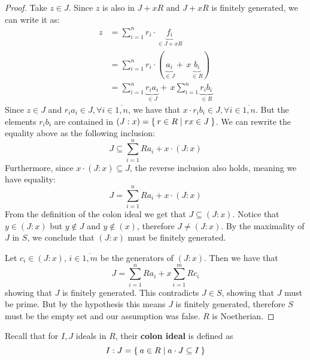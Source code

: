 \begin{proof}
Take \(z \in J\). Since \(z\) is also in \(J + xR\) and \(J + xR\) is finitely generated, we can write it as:
\begin{align*}
    z &= \sum_{i = 1}^{n} r_i \cdot \underbrace{f_i}_{\in J + xR} \\
    &= \sum_{i = 1}^{n} r_i \cdot (\underbrace{a_i}_{\in J} + \, x \underbrace{b_i}_{\in R}) \\
    &= \sum_{i = 1}^{n} \underbrace{r_i a_i}_{\in J} + \, x \sum_{i = 1}^{n} \underbrace{r_i b_i}_{\in R}
\end{align*}
Since \(z \in J\) and \(r_i a_i \in J, \forall i \in \overline{1, n}\), we have that \(x \cdot r_i b_i \in J, \forall i \in \overline{1, n}\). But the elements \(r_i b_i\) are contained in \((J : x) = \Set{ r \in R \mid rx \in J}\). We can rewrite the equality above as the following inclusion:
\[
    J \subseteq \sum_{i = 1}^{n} R a_i + x \cdot (J : x)
\]
Furthermore, since \(x \cdot (J : x) \subseteq J\), the reverse inclusion also holds, meaning we have equality:
\[
    J = \sum_{i = 1}^{n} R a_i + x \cdot (J : x)
\]
From the definition of the colon ideal we get that \(J \subseteq (J : x)\). Notice that \(y \in (J : x)\) but \(y \not\in J\) and \(y \not \in (x)\), therefore \(J \neq (J : x)\). By the maximality of \(J\) in \(S\), we conclude that \((J : x)\) must be finitely generated.

Let \(c_i \in (J : x), \, i \in \overline{1, m}\) be the generators of \((J : x)\). Then we have that
\[
    J = \sum_{i = 1}^{n} R a_i + x \sum_{i = 1}^{m} R c_i
\]
showing that \(J\) is finitely generated. This contradicts \(J \in S\), showing that \(J\) must be prime. But by the hypothesis this means \(J\) is finitely generated, therefore \(S\) must be the empty set and our assumption was false. \(R\) is Noetherian.
\end{proof}

\begin{definition}
Recall that for \(I, J\) ideals in \(R\), their \textbf{colon ideal} is defined as
\[
    I : J = \Set{ a \in R \mid a \cdot J \subseteq I }
\]
\end{definition}

